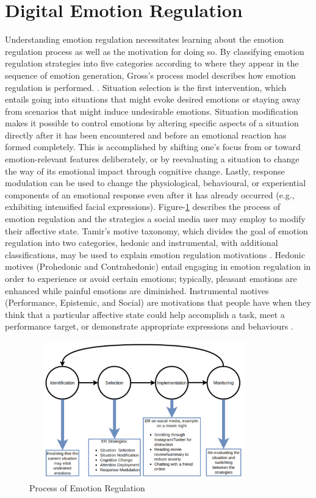 \documentclass[lettersize,journal]{IEEEtran}
\begin{document}
\section{Digital Emotion Regulation}
Understanding emotion regulation necessitates learning about the emotion regulation process as well as the motivation for doing so. By classifying emotion regulation strategies into five categories according to where they appear in the sequence of emotion generation, Gross's process model describes how emotion regulation is performed. \cite{wadley2020digital}. Situation selection is the first intervention, which entails going into situations that might evoke desired emotions or staying away from scenarios that might induce undesirable emotions. Situation modification makes it possible to control emotions by altering specific aspects of a situation directly after it has been encountered and before an emotional reaction has formed completely. This is accomplished by shifting one's focus from or toward emotion-relevant features deliberately, or by reevaluating a situation to change the way of its emotional impact through cognitive change. Lastly, response modulation can be used to change the physiological, behavioural, or experiential components of an emotional response even after it has already occurred (e.g., exhibiting intensified facial expressions).  Figure-\ref{fig:Process} describes the process of emotion regulation and the strategies a social media user may employ to modify their affective state. Tamir's motive taxonomy, which divides the goal of emotion regulation into two categories, hedonic and instrumental, with additional classifications, may be used to explain emotion regulation motivations \cite{wadley2020digital}. Hedonic motives (Prohedonic and Contrahedonic) entail engaging in emotion regulation in order to experience or avoid certain emotions; typically, pleasant emotions are enhanced while painful emotions are diminished. Instrumental motives (Performance, Epistemic, and Social) are motivations that people have when they think that a particular affective state could help accomplish a task, meet a performance target, or demonstrate appropriate expressions and behaviours \cite{wadley2020digital}.
\begin{figure}[h]
  
    \centering
    \includegraphics[width=10cm,height=6cm,keepaspectratio]{up_model.pdf}
  \caption{Process of Emotion Regulation}
  \label{fig:Process}
  \end{figure}
\end{document}
